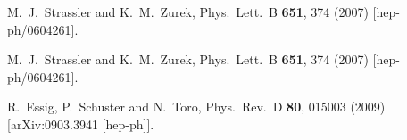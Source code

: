   M.~J.~Strassler and K.~M.~Zurek,
  Phys.\ Lett.\ B {\bf 651}, 374 (2007)
  [hep-ph/0604261].
  

  M.~J.~Strassler and K.~M.~Zurek,
  Phys.\ Lett.\ B {\bf 651}, 374 (2007)
  [hep-ph/0604261].
  
  R.~Essig, P.~Schuster and N.~Toro,
  Phys.\ Rev.\ D {\bf 80}, 015003 (2009)
  [arXiv:0903.3941 [hep-ph]].





